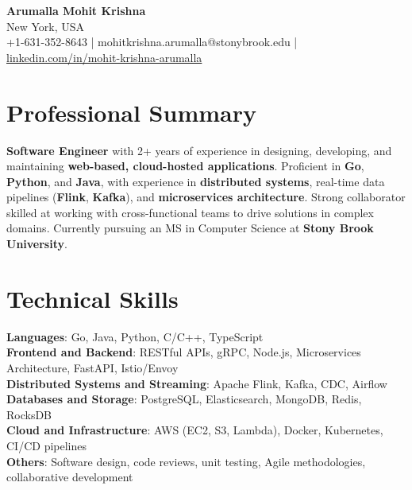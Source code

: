 \documentclass[letterpaper,11pt]{article}
\begin{document}
\begin{center}
  {\Large \textbf{Arumalla Mohit Krishna}} \\
  New York, USA \\
  +1-631-352-8643 \enspace | \enspace mohitkrishna.arumalla@stonybrook.edu \enspace | \enspace \href{https://www.linkedin.com/in/mohit-krishna-arumalla}{linkedin.com/in/mohit-krishna-arumalla}
\end{center}

\section{Professional Summary}
  \begin{itemize}[leftmargin=0.15in, label={}]
    \small{\item{
     \textbf{Software Engineer} with 2+ years of experience in designing, developing, and maintaining \textbf{web-based, cloud-hosted applications}. Proficient in \textbf{Go}, \textbf{Python}, and \textbf{Java}, with experience in \textbf{distributed systems}, real-time data pipelines (\textbf{Flink}, \textbf{Kafka}), and \textbf{microservices architecture}. Strong collaborator skilled at working with cross-functional teams to drive solutions in complex domains. Currently pursuing an MS in Computer Science at \textbf{Stony Brook University}.
    }}
  \end{itemize}
\vspace{-16pt}

\section{Technical Skills}
 \begin{itemize}[leftmargin=0.15in, label={}]
    \small{\item{
     \textbf{Languages}: Go, Java, Python, C/C++, TypeScript \\
     \textbf{Frontend and Backend}: RESTful APIs, gRPC, Node.js, Microservices Architecture, FastAPI, Istio/Envoy \\
     \textbf{Distributed Systems and Streaming}: Apache Flink, Kafka, CDC, Airflow \\
     \textbf{Databases and Storage}: PostgreSQL, Elasticsearch, MongoDB, Redis, RocksDB \\
     \textbf{Cloud and Infrastructure}: AWS (EC2, S3, Lambda), Docker, Kubernetes, CI/CD pipelines \\
     \textbf{Others}: Software design, code reviews, unit testing, Agile methodologies, collaborative development
    }}
 \end{itemize}
\vspace{-16pt}
\end{document}
